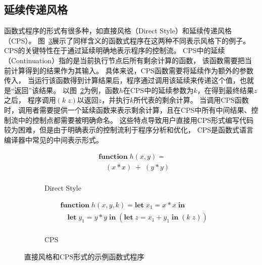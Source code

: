 \subsection{延续传递风格} \label{sec:bg_cps}

函数式程序的形式有很多种，如直接风格（Direct Style）和延续传递风格（CPS）。
图~\ref{cpsdirect}展示了同样含义的函数式程序在这两种不同表示风格下的例子。
CPS的关键特性在于通过延续明确地表示程序的控制流。
CPS中的延续（Continuation）指的是当前执行节点后所有剩余计算的函数，
该函数需要把当前计算得到的结果作为其输入。
具体来说，CPS函数需要将延续作为额外的参数传入，
当运行该函数得到计算结果后，程序通过调用该延续来传递这个值，也就是``返回''该结果。
以图~\ref{fig:cps2}为例，函数$h$在CPS中的延续参数为$k$，在得到最终结果$z$之后，
程序调用$(k\; z)$以返回$z$，并执行$k$所代表的剩余计算。
当调用CPS函数时，调用者需要提供一个延续函数来表示剩余计算，且在CPS中所有中间结果、控制流中的控制点都需要被明确命名。
这些特点导致用户直接用CPS形式编写代码较为困难，但是由于明确表示的控制流利于程序分析和优化，
CPS是函数式语言编译器中常见的中间表示形式。

\begin{figure}
    \centering
    \begin{subfigure}[b]{0.3\textwidth}
        \flushright
     \begin{equation}
        \nonumber
        \begin{aligned}
        &  \mathbf{function}\; h(x,y) = \\
        & \quad (x*x)\; +\; (y*y) \\
        \end{aligned}
    \end{equation}
    \caption{Direct Style}
        \label{fig:ori2}
    \end{subfigure}
    \begin{subfigure}[b]{0.6\textwidth}
        \flushleft
        \begin{equation}
            \nonumber
            \begin{aligned}
            & \mathbf{function}\; h(x,y,k)= \mathbf{let}\; x_1=x*x\; \mathbf{in} \\
            &  \quad   \mathbf{let}\; y_1=y*y\; \mathbf{in}\; (\mathbf{let}\; z=x_1+y_1\; \mathbf{in}\; (k\; z)) \\
            \end{aligned}
        \end{equation}
        \caption{CPS}
        \label{fig:cps2}
    \end{subfigure}
    \caption{直接风格和CPS形式的示例函数式程序}\label{cpsdirect}
  \end{figure}

